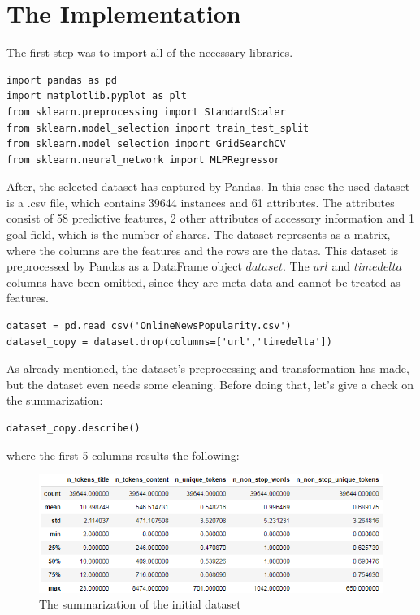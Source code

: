 \section{The Implementation}

The first step was to import all of the necessary libraries.
\begin{lstlisting}
import pandas as pd
import matplotlib.pyplot as plt
from sklearn.preprocessing import StandardScaler
from sklearn.model_selection import train_test_split
from sklearn.model_selection import GridSearchCV
from sklearn.neural_network import MLPRegressor
\end{lstlisting}

After, the selected dataset has captured by Pandas. In this case the used dataset is a .csv file, which contains 39644 instances and 61 attributes. The attributes consist of 58 predictive features, 2 other attributes of accessory information and 1 goal field, which is the number of shares. The dataset represents as a matrix, where the columns are the features and the rows are the datas. This dataset is preprocessed by Pandas as a DataFrame object $dataset$. The $url$ and $timedelta$ columns have been omitted, since they are meta-data and cannot be treated as features. 
\begin{lstlisting}
dataset = pd.read_csv('OnlineNewsPopularity.csv')
dataset_copy = dataset.drop(columns=['url','timedelta'])
\end{lstlisting}

As already mentioned, the dataset's preprocessing and transformation has made, but the dataset even needs some cleaning. Before doing that, let's give a check on the summarization:
\begin{lstlisting}
dataset_copy.describe()
\end{lstlisting}
where the first 5 columns results the following:
\begin{figure}[h]
	\centering
	\includegraphics[height=0.34\linewidth]{./figures/describe1}
	\caption{The summarization of the initial dataset}
	\label{fig:describe1}
\end{figure}

